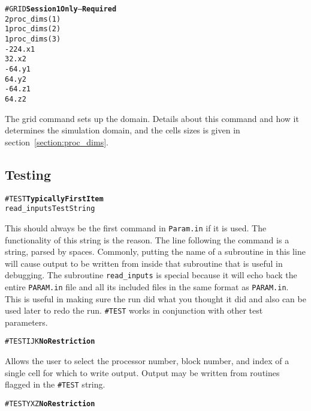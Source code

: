 \begin{alltt}
#GRID        \hfill {\bf Session 1 Only} -- {\bf Required}
2                      proc\_dims(1)
1                      proc\_dims(2)
1                      proc\_dims(3)
-224.                  x1 
 32.                   x2 
-64.                   y1 
 64.                   y2 
-64.                   z1 
 64.                   z2 
\end{alltt}

The grid command sets up the domain. 
Details about this command and how it determines the simulation domain,
and the cells sizes is given in section~\ref{section:proc_dims}.
\ \ \\


\subsection{Testing \label{section:testing}} 

\begin{alltt}
#TEST  \hfill {\bf Typically First Item}
read_inputs            Test String
\end{alltt}

This should always be the first command in {\tt Param.in} if it
is used.  The functionality of this string is the reason.  The
line following the command is a string, parsed by spaces.  Commonly,
putting the name of a subroutine in this line will cause output
to be written from inside that subroutine that is useful in debugging.
The subroutine {\tt read\_inputs} is special because it will echo
back the entire {\tt PARAM.in} file and all its included files 
in the same format as {\tt PARAM.in}.  This is useful in making
sure the run did what you thought it did and also can be used later
to redo the run.  {\tt \#TEST} works in conjunction with other 
test parameters.
\ \ \\

\begin{alltt}
#TESTIJK \hfill {\bf No Restriction}
\end{alltt}

Allows the user to select the processor number, block number, and index
of a single cell for which to write output.  Output may be written from
routines flagged in the {\tt \#TEST} string.
\ \ \\

\begin{alltt}
#TESTYXZ \hfill {\bf No Restriction}
\end{alltt}

